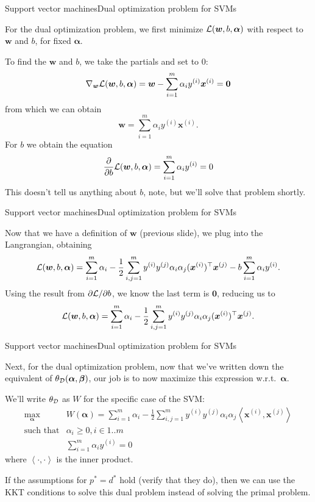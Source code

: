 \documentclass{beamer}
\renewcommand{\vec}[1]{\boldsymbol{#1}}
\begin{document}
\begin{frame}{Support vector machines}{Dual optimization problem for SVMs}

  For the dual optimization problem, we first minimize ${\cal
    L}(\vec{w},b,\vec{\alpha})$ with respect to $\vec{w}$ and $b$, for
  \alert{fixed} $\vec{\alpha}$.

  \medskip

  To find the $\vec{w}$ and $b$, we take the partials and set to 0:
  \[ \nabla_{\vec{w}}{\cal L}(\vec{w},b,\vec{\alpha}) =
  \vec{w} - \sum_{i=1}^m\alpha_i y^{(i)}\vec{x}^{(i)} = \vec{0} \]
  from which we can obtain
  \[ \vec{w} = \sum_{i=1}^m \alpha_i y^{(i)} \vec{x}^{(i)} .\]
  For $b$ we obtain the equation
  \[ \frac{\partial}{\partial b}{\cal L}(\vec{w},b,\vec{\alpha}) =
  \sum_{i=1}^m\alpha_i y^{(i)} = 0 \]
  This doesn't tell us anything about $b$, note, but we'll solve that problem
  shortly.

\end{frame}


\begin{frame}{Support vector machines}{Dual optimization problem for SVMs}

  Now that we have a definition of $\vec{w}$ (previous slide), we plug
  into the Langrangian, obtaining
  \[ {\cal L}(\vec{w},b,\vec{\alpha}) = \sum_{i=1}^m\alpha_i - \frac{1}{2}\sum_{i,j=1}^m y^{(i)}y^{(j)}\alpha_i\alpha_j(\vec{x}^{(i)})^\top\vec{x}^{(j)}- b\sum_{i=1}^m\alpha_i y^{(i)}. \]
  Using the result from $\partial {\cal L}/\partial b$, we know the
  last term is $\vec{0}$, reducing us to
  \[ {\cal L}(\vec{w},b,\vec{\alpha}) = \sum_{i=1}^m\alpha_i - \frac{1}{2}\sum_{i,j=1}^m y^{(i)}y^{(j)}\alpha_i\alpha_j(\vec{x}^{(i)})^\top\vec{x}^{(j)}. \]
  
\end{frame}


\begin{frame}{Support vector machines}{Dual optimization problem for SVMs}

  Next, for the dual optimization problem, now that we've written
  down the equivalent of 
  $\theta_{\cal D}(\vec{\alpha},\vec{\beta})$, our job is to now maximize
  this expression w.r.t.\ $\vec{\alpha}$.
 
  \medskip

  We'll write $\theta_{\cal D}$ as $W$ for the specific case of the SVM:
  \[ \begin{array}{rl}
    \max_{\vec{\alpha}} & W(\vec{\alpha}) = \sum_{i=1}^m\alpha_i - \frac{1}{2}\sum_{i,j=1}^m y^{(i)}y^{(j)}\alpha_i\alpha_j\left< \vec{x}^{(i)},\vec{x}^{(j)}\right> \\
    \text{such that} & \alpha_i \ge 0, i \in 1..m \\
    & \sum_{i=1}^m\alpha_iy^{(i)} = 0
  \end{array} \]
  where $\left<\cdot,\cdot\right>$ is the inner product.

  \medskip
  
  If the assumptions for $p^*=d^*$ hold (verify that they do), then we
  can use the KKT conditions to solve this dual problem instead of
  solving the primal problem.
  
\end{frame}
\end{document}
